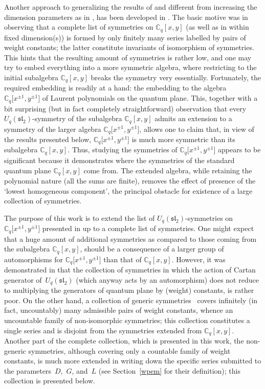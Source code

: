 \documentclass[10pt,a4paper]{amsart}
\numberwithin{equation}{section}
\begin{document}
Another approach to generalizing the results of \cite{DS} and different from increasing the dimension parameters as in \cite{DHL}, has been developed in \cite{S}. The basic motive was in observing that a complete list of symmetries on $\mathbb{C}_q[x,y]$ (as well as in \cite{DHL} within fixed dimension(s)) is formed by only finitely many series labelled by pairs of weight constants; the latter constitute invariants of isomorphism of symmetries. This hints that the resulting amount of symmetries is rather low, and one may try to embed everything into a more symmetric algebra, where restricting to the initial subalgebra $\mathbb{C}_q[x,y]$ breaks the symmetry very essentially. Fortunately, the required embedding is readily at a hand: the embedding to the algebra $\mathbb{C}_q\big[x^{\pm 1},y^{\pm 1}\big]$ of Laurent polynomials on the quantum plane. This, together with a bit surprising (but in fact completely straightforward) observation that every $U_q(\mathfrak{sl}_2)$-symmetry of the subalgebra $\mathbb{C}_q[x,y]$ admits an extension to a symmetry of the larger algebra $\mathbb{C}_q\big[x^{\pm 1},y^{\pm 1}\big]$, allows one to claim that, in view of the results presented below, $\mathbb{C}_q\big[x^{\pm 1},y^{\pm 1}\big]$ is much more symmetric than its subalgebra $\mathbb{C}_q[x,y]$. Thus, studying the symmetries of $\mathbb{C}_q\big[x^{\pm 1},y^{\pm 1}\big]$ appears to be significant because it demonstrates where the symmetries of the standard quantum plane $\mathbb{C}_q[x,y]$ come from. The extended algebra, while retaining the polynomial nature (all the sums are finite), removes the effect of presence of the `lowest homogeneous component', the principal obstacle for existence of a large collection of symmetries.

The purpose of this work is to extend the list of $U_q(\mathfrak{sl}_2)$-symmetries on $\mathbb{C}_q\big[x^{\pm 1},y^{\pm 1}\big]$ presented in \cite{S} up to a complete list of symmetries. One might expect that a huge amount of additional symmetries as compared to those coming from the subalgebra $\mathbb{C}_q[x,y]$, should be a consequence of a larger group of automorphisms for $\mathbb{C}_q\big[x^{\pm 1},y^{\pm 1}\big]$ than that of $\mathbb{C}_q[x,y]$. However, it was demonstrated in \cite{S} that the collection of symmetries in which the action of Cartan generator of~$U_q(\mathfrak{sl}_2)$ (which anyway acts by an automorphism) does not reduce to multiplying the generators of quantum plane by (weight) constants, is rather poor. On the other hand, a collection of generic symmetries~\cite{S} covers infinitely (in fact, uncountably) many admissible pairs of weight constants, whence an uncountable family of non-isomorphic symmetries; this collection constitutes a single series and is disjoint from the symmetries extended from $\mathbb{C}_q[x,y]$. Another part of the complete collection, which is presented in this work, the non-generic symmetries, although covering only a countable family of weight constants, is much more extended in writing down the specific series submitted to the parameters~$D$,~$G$, and~$L$ (see Section~\ref{wpem} for their definition); this collection is presented below.
\end{document}

